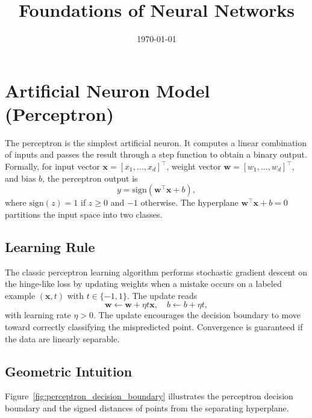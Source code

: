 ﻿\documentclass{article}
\title{Foundations of Neural Networks}
\author{}
\date{\today}
\begin{document}
\maketitle
\tableofcontents
\FloatBarrier

\section{Artificial Neuron Model (Perceptron)}
The perceptron is the simplest artificial neuron. It computes a linear combination of inputs and passes the result through a step function to obtain a binary output. Formally, for input vector $\mathbf{x}=[x_1,\ldots,x_d]^\top$, weight vector $\mathbf{w}=[w_1,\ldots,w_d]^\top$, and bias $b$, the perceptron output is
\begin{equation}
  y = \mathrm{sign}\left(\mathbf{w}^\top \mathbf{x} + b\right),
\end{equation}
where $\mathrm{sign}(z) = 1$ if $z\geq0$ and $-1$ otherwise. The hyperplane $\mathbf{w}^\top\mathbf{x}+b=0$ partitions the input space into two classes.

\subsection{Learning Rule}
The classic perceptron learning algorithm performs stochastic gradient descent on the hinge-like loss by updating weights when a mistake occurs on a labeled example $(\mathbf{x}, t)$ with $t\in\{-1,1\}$. The update reads
\begin{equation}
  \mathbf{w} \leftarrow \mathbf{w} + \eta t \mathbf{x}, \quad b \leftarrow b + \eta t,
\end{equation}
with learning rate $\eta>0$. The update encourages the decision boundary to move toward correctly classifying the mispredicted point. Convergence is guaranteed if the data are linearly separable.

\subsection{Geometric Intuition}
Figure~\ref{fig:perceptron_decision_boundary} illustrates the perceptron decision boundary and the signed distances of points from the separating hyperplane.
\end{document}
